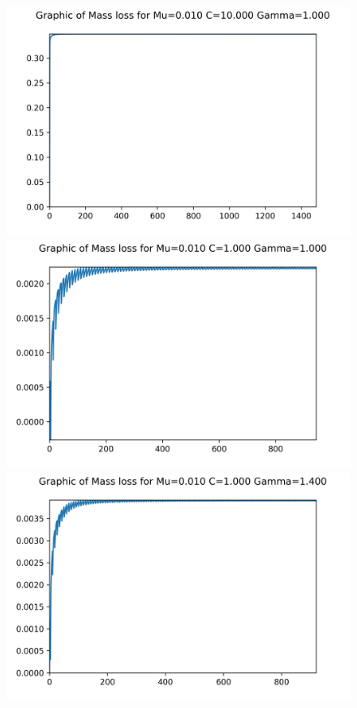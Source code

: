 \begin{figure}[H]
	\centering
	\includegraphics[scale=0.65]{../graphs_data_nonsmooth_1/mass/Graph_mass_mu0.010_C10.000_gamma1.000.png}
	\includegraphics[scale=0.65]{../graphs_data_nonsmooth_1/mass/Graph_mass_mu0.010_C1.000_gamma1.000.png}	
	\includegraphics[scale=0.65]{../graphs_data_nonsmooth_1/mass/Graph_mass_mu0.010_C1.000_gamma1.400.png}
\end{figure}

